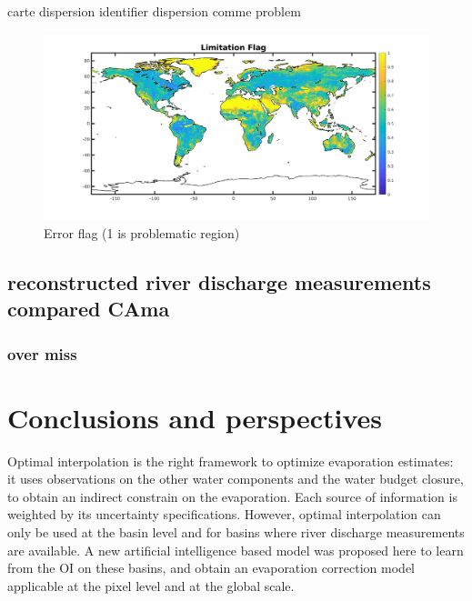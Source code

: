 \documentclass[draft]{agujournal2019}
\begin{document}
carte dispersion
identifier dispersion comme problem 

\begin{figure}[h]
\includegraphics[width=\textwidth]{std_flag.png}
\caption{Error flag (1 is problematic region)}
\end{figure}


\subsection{reconstructed river discharge measurements compared CAma } 
\subsubsection{over miss}






\section{Conclusions and perspectives}
Optimal interpolation is the right framework to optimize evaporation estimates: it uses observations on the other water components and the water budget closure, to obtain an indirect constrain on the evaporation. Each source of information is weighted by its uncertainty specifications. However, optimal interpolation can only be used at the basin level and for basins where river discharge measurements are available. A new artificial intelligence based model was proposed here to learn from the OI on these basins, and obtain an evaporation correction model applicable at the pixel level and at the global scale. 
\end{document}

